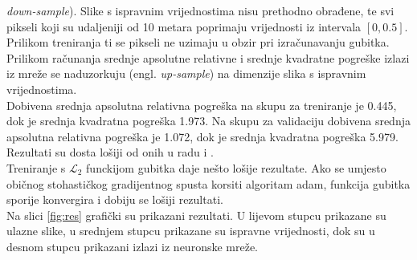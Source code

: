 \documentclass[times, utf8, zavrsni, numeric]{fer}
\begin{document}
\textit{down-sample}). Slike s ispravnim vrijednostima nisu prethodno obrađene,
te svi pikseli koji su udaljeniji od 10 metara poprimaju vrijednosti iz
intervala $[0, 0.5]$. Prilikom treniranja ti se pikseli ne uzimaju u obzir pri
izračunavanju gubitka. Prilikom računanja srednje apsolutne relativne i srednje
kvadratne pogreške izlazi iz mreže se naduzorkuju (engl. \textit{up-sample}) na
dimenzije slika s ispravnim vrijednostima.
\\\indent Dobivena srednja apsolutna relativna pogreška na skupu za treniranje 
je 0.445, dok je srednja kvadratna pogreška 1.973. Na skupu za validaciju 
dobivena srednja apsolutna relativna pogreška je 1.072, dok je srednja
kvadratna pogreška 5.979. Rezultati su dosta lošiji od onih u radu
\citep{DBLP:journals/corr/LainaRBTN16} i \cite{NIPS2014_5539}.
\\\indent Treniranje s $\mathcal{L}_2$ funckijom gubitka daje nešto lošije
rezultate. Ako se umjesto običnog stohastičkog gradijentnog spusta korsiti
algoritam adam, funkcija gubitka sporije konvergira i dobiju se lošiji
rezultati.
\\\indent Na slici \ref{fig:res} grafički su prikazani rezultati. U lijevom 
stupcu prikazane su ulazne slike, u srednjem stupcu prikazane su ispravne
vrijednosti, dok su u desnom stupcu prikazani izlazi iz neuronske mreže.
\end{document}

